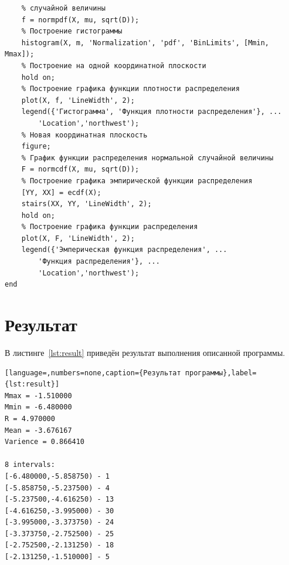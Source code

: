 \begin{lstlisting}[caption={Текст программы},label={lst:programm}]
    % График функции плотности распределения вероятностей нормальной 
    % случайной величины
    f = normpdf(X, mu, sqrt(D));
    % Построение гистограммы
    histogram(X, m, 'Normalization', 'pdf', 'BinLimits', [Mmin, Mmax]);
    % Построение на одной координатной плоскости
    hold on;
    % Построение графика функции плотности распределения
    plot(X, f, 'LineWidth', 2);
    legend({'Гистограмма', 'Функция плотности распределения'}, ...
        'Location','northwest');
    % Новая координатная плоскость
    figure;
    % График функции распределения нормальной случайной величины
    F = normcdf(X, mu, sqrt(D));
    % Построение графика эмпирической функции распределения
    [YY, XX] = ecdf(X);
    stairs(XX, YY, 'LineWidth', 2);
    hold on;
    % Построение графика функции распределения
    plot(X, F, 'LineWidth', 2);
    legend({'Эмперическая функция распределения', ...
        'Функция распределения'}, ...
        'Location','northwest');
end
\end{lstlisting}

\section{Результат}

В листинге~\ref{lst:result} приведён результат выполнения описанной программы.
\begin{lstlisting}[language=,numbers=none,caption={Результат программы},label={lst:result}]
Mmax = -1.510000
Mmin = -6.480000
R = 4.970000
Mean = -3.676167
Varience = 0.866410

8 intervals:
[-6.480000,-5.858750) - 1
[-5.858750,-5.237500) - 4
[-5.237500,-4.616250) - 13
[-4.616250,-3.995000) - 30
[-3.995000,-3.373750) - 24
[-3.373750,-2.752500) - 25
[-2.752500,-2.131250) - 18
[-2.131250,-1.510000] - 5\end{lstlisting}

